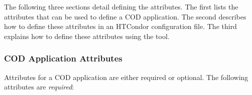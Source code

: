 The following three sections detail defining the attributes.
The first lists the attributes that can be used to define a COD
application.
The second describes how to define these attributes in an HTCondor
configuration file.
The third explains how to define these attributes using the  tool.


\subsubsection{\label{sec:cod-application-attributes}
COD Application Attributes}


Attributes for a COD application are either required
or optional.
The following attributes are \emph{required}:

